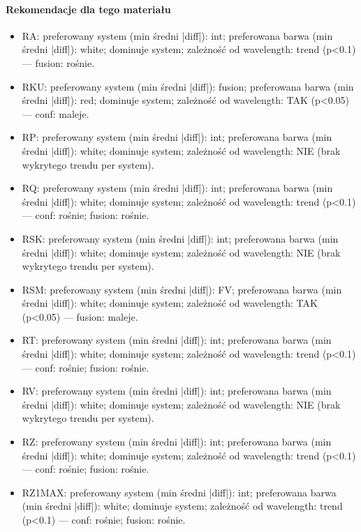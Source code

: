 \documentclass[
  10pt,
]{article}
\begin{document}
\paragraph{Rekomendacje dla tego materiału}
\begin{itemize}
\item RA: preferowany system (min średni |diff|): int; preferowana barwa (min średni |diff|): white; dominuje system; zależność od wavelength: trend (p<0.1) — fusion: rośnie.
\item RKU: preferowany system (min średni |diff|): fusion; preferowana barwa (min średni |diff|): red; dominuje system; zależność od wavelength: TAK (p<0.05) — conf: maleje.
\item RP: preferowany system (min średni |diff|): int; preferowana barwa (min średni |diff|): white; dominuje system; zależność od wavelength: NIE (brak wykrytego trendu per system).
\item RQ: preferowany system (min średni |diff|): int; preferowana barwa (min średni |diff|): white; dominuje system; zależność od wavelength: trend (p<0.1) — conf: rośnie; fusion: rośnie.
\item RSK: preferowany system (min średni |diff|): int; preferowana barwa (min średni |diff|): white; dominuje system; zależność od wavelength: NIE (brak wykrytego trendu per system).
\item RSM: preferowany system (min średni |diff|): FV; preferowana barwa (min średni |diff|): white; dominuje system; zależność od wavelength: TAK (p<0.05) — fusion: maleje.
\item RT: preferowany system (min średni |diff|): int; preferowana barwa (min średni |diff|): white; dominuje system; zależność od wavelength: trend (p<0.1) — conf: rośnie; fusion: rośnie.
\item RV: preferowany system (min średni |diff|): int; preferowana barwa (min średni |diff|): white; dominuje system; zależność od wavelength: NIE (brak wykrytego trendu per system).
\item RZ: preferowany system (min średni |diff|): int; preferowana barwa (min średni |diff|): white; dominuje system; zależność od wavelength: trend (p<0.1) — conf: rośnie; fusion: rośnie.
\item RZ1MAX: preferowany system (min średni |diff|): int; preferowana barwa (min średni |diff|): white; dominuje system; zależność od wavelength: trend (p<0.1) — conf: rośnie; fusion: rośnie.
\end{itemize}
\end{document}

